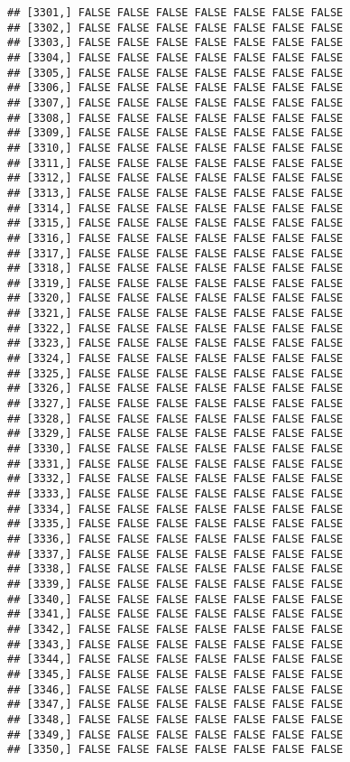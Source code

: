 \documentclass[
]{article}
\begin{document}
\begin{verbatim}
## [3301,] FALSE FALSE FALSE FALSE FALSE FALSE FALSE
## [3302,] FALSE FALSE FALSE FALSE FALSE FALSE FALSE
## [3303,] FALSE FALSE FALSE FALSE FALSE FALSE FALSE
## [3304,] FALSE FALSE FALSE FALSE FALSE FALSE FALSE
## [3305,] FALSE FALSE FALSE FALSE FALSE FALSE FALSE
## [3306,] FALSE FALSE FALSE FALSE FALSE FALSE FALSE
## [3307,] FALSE FALSE FALSE FALSE FALSE FALSE FALSE
## [3308,] FALSE FALSE FALSE FALSE FALSE FALSE FALSE
## [3309,] FALSE FALSE FALSE FALSE FALSE FALSE FALSE
## [3310,] FALSE FALSE FALSE FALSE FALSE FALSE FALSE
## [3311,] FALSE FALSE FALSE FALSE FALSE FALSE FALSE
## [3312,] FALSE FALSE FALSE FALSE FALSE FALSE FALSE
## [3313,] FALSE FALSE FALSE FALSE FALSE FALSE FALSE
## [3314,] FALSE FALSE FALSE FALSE FALSE FALSE FALSE
## [3315,] FALSE FALSE FALSE FALSE FALSE FALSE FALSE
## [3316,] FALSE FALSE FALSE FALSE FALSE FALSE FALSE
## [3317,] FALSE FALSE FALSE FALSE FALSE FALSE FALSE
## [3318,] FALSE FALSE FALSE FALSE FALSE FALSE FALSE
## [3319,] FALSE FALSE FALSE FALSE FALSE FALSE FALSE
## [3320,] FALSE FALSE FALSE FALSE FALSE FALSE FALSE
## [3321,] FALSE FALSE FALSE FALSE FALSE FALSE FALSE
## [3322,] FALSE FALSE FALSE FALSE FALSE FALSE FALSE
## [3323,] FALSE FALSE FALSE FALSE FALSE FALSE FALSE
## [3324,] FALSE FALSE FALSE FALSE FALSE FALSE FALSE
## [3325,] FALSE FALSE FALSE FALSE FALSE FALSE FALSE
## [3326,] FALSE FALSE FALSE FALSE FALSE FALSE FALSE
## [3327,] FALSE FALSE FALSE FALSE FALSE FALSE FALSE
## [3328,] FALSE FALSE FALSE FALSE FALSE FALSE FALSE
## [3329,] FALSE FALSE FALSE FALSE FALSE FALSE FALSE
## [3330,] FALSE FALSE FALSE FALSE FALSE FALSE FALSE
## [3331,] FALSE FALSE FALSE FALSE FALSE FALSE FALSE
## [3332,] FALSE FALSE FALSE FALSE FALSE FALSE FALSE
## [3333,] FALSE FALSE FALSE FALSE FALSE FALSE FALSE
## [3334,] FALSE FALSE FALSE FALSE FALSE FALSE FALSE
## [3335,] FALSE FALSE FALSE FALSE FALSE FALSE FALSE
## [3336,] FALSE FALSE FALSE FALSE FALSE FALSE FALSE
## [3337,] FALSE FALSE FALSE FALSE FALSE FALSE FALSE
## [3338,] FALSE FALSE FALSE FALSE FALSE FALSE FALSE
## [3339,] FALSE FALSE FALSE FALSE FALSE FALSE FALSE
## [3340,] FALSE FALSE FALSE FALSE FALSE FALSE FALSE
## [3341,] FALSE FALSE FALSE FALSE FALSE FALSE FALSE
## [3342,] FALSE FALSE FALSE FALSE FALSE FALSE FALSE
## [3343,] FALSE FALSE FALSE FALSE FALSE FALSE FALSE
## [3344,] FALSE FALSE FALSE FALSE FALSE FALSE FALSE
## [3345,] FALSE FALSE FALSE FALSE FALSE FALSE FALSE
## [3346,] FALSE FALSE FALSE FALSE FALSE FALSE FALSE
## [3347,] FALSE FALSE FALSE FALSE FALSE FALSE FALSE
## [3348,] FALSE FALSE FALSE FALSE FALSE FALSE FALSE
## [3349,] FALSE FALSE FALSE FALSE FALSE FALSE FALSE
## [3350,] FALSE FALSE FALSE FALSE FALSE FALSE FALSE

\end{verbatim}
\end{document}
